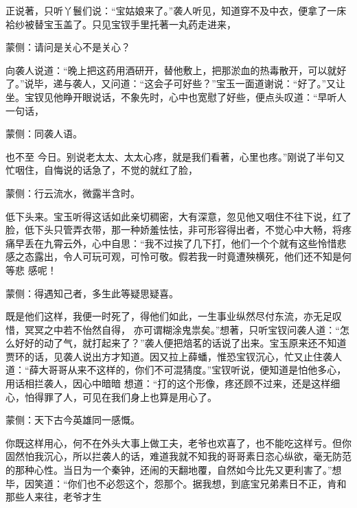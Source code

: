\begin{parag}
    正说著，只听丫鬟们说：“宝姑娘来了。”袭人听见，知道穿不及中衣，便拿了一床袷纱被替宝玉盖了。只见宝钗手里托著一丸药走进来，\begin{note}蒙侧：请问是关心不是关心？\end{note}向袭人说道：“晚上把这药用酒研开，替他敷上，把那淤血的热毒散开，可以就好了。”说毕，递与袭人，又问道：“这会子可好些？”宝玉一面道谢说：“好了。”又让坐。宝钗见他睁开眼说话，不象先时，心中也宽慰了好些，便点头叹道：“早听人一句话，\begin{note}蒙侧：同袭人语。\end{note}也不至 今日。别说老太太、太太心疼，就是我们看著，心里也疼。”刚说了半句又忙咽住，自悔说的话急了，不觉的就红了脸，\begin{note}蒙侧：行云流水，微露半含时。\end{note}低下头来。宝玉听得这话如此亲切稠密，大有深意，忽见他又咽住不往下说，红了脸，低下头只管弄衣带，那一种娇羞怯怯，非可形容得出者，不觉心中大畅，将疼痛早丢在九霄云外，心中自思：“我不过挨了几下打，他们一个个就有这些怜惜悲感之态露出，令人可玩可观，可怜可敬。假若我一时竟遭殃横死，他们还不知是何等悲 感呢！\begin{note}蒙侧：得遇知己者，多生此等疑思疑喜。\end{note}既是他们这样，我便一时死了，得他们如此，一生事业纵然尽付东流，亦无足叹惜，冥冥之中若不怡然自得， 亦可谓糊涂鬼祟矣。”想著，只听宝钗问袭人道：“怎么好好的动了气，就打起来了？”袭人便把焙茗的话说了出来。宝玉原来还不知道贾环的话，见袭人说出方才知道。因又拉上薛蟠，惟恐宝钗沉心，忙又止住袭人道：“薛大哥哥从来不这样的，你们不可混猜度。”宝钗听说，便知道是怕他多心，用话相拦袭人，因心中暗暗 想道：“打的这个形像，疼还顾不过来，还是这样细心，怕得罪了人，可见在我们身上也算是用心了。\begin{note}蒙侧：天下古今英雄同一感慨。\end{note}你既这样用心，何不在外头大事上做工夫，老爷也欢喜了，也不能吃这样亏。但你固然怕我沉心，所以拦袭人的话，难道我就不知我的哥哥素日恣心纵欲，毫无防范的那种心性。当日为一个秦钟，还闹的天翻地覆，自然如今比先又更利害了。”想毕，因笑道：“你们也不必怨这个，怨那个。据我想，到底宝兄弟素日不正，肯和那些人来往，老爷才生 
\end{parag}

